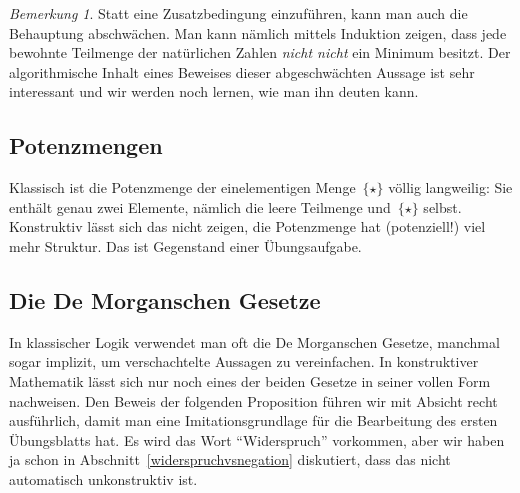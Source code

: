 \documentclass[a4paper,ngerman,12pt]{scrartcl}
\theoremstyle{definition}
\theoremstyle{plain}
\theoremstyle{remark}
\newtheorem{bem}[defn]{Bemerkung}
\renewcommand{\_}{\mathpunct{.}\,}
\newcommand{\?}{\,{:}\,}
\begin{document}
\begin{bem}Statt eine Zusatzbedingung einzuführen, kann man auch die Behauptung
abschwächen. Man kann nämlich mittels Induktion zeigen, dass jede
bewohnte Teilmenge der natürlichen Zahlen \emph{nicht nicht} ein Minimum
besitzt. Der algorithmische Inhalt eines Beweises dieser abgeschwächten Aussage
ist sehr interessant und wir werden noch lernen, wie man ihn deuten kann.\end{bem}


\subsection{Potenzmengen}

Klassisch ist die Potenzmenge der einelementigen Menge~$\{\star\}$ völlig
langweilig: Sie enthält genau zwei Elemente, nämlich die leere Teilmenge
und~$\{\star\}$ selbst. Konstruktiv lässt sich das nicht zeigen, die
Potenzmenge hat (potenziell!) viel mehr Struktur. Das ist Gegenstand einer
Übungsaufgabe.


\subsection{Die De Morganschen Gesetze}

In klassischer Logik verwendet man oft die De Morganschen Gesetze, manchmal
sogar implizit, um verschachtelte Aussagen zu vereinfachen. In konstruktiver
Mathematik lässt sich nur noch eines der beiden Gesetze in seiner vollen Form
nachweisen. Den Beweis der folgenden Proposition führen wir mit Absicht recht
ausführlich, damit man eine Imitationsgrundlage für die Bearbeitung des ersten
Übungsblatts hat. Es wird das Wort "`Widerspruch"' vorkommen, aber wir haben ja
schon in Abschnitt~\ref{widerspruchvsnegation} diskutiert, dass das nicht
automatisch unkonstruktiv ist.
\end{document}
